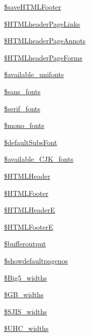 \begin{DoxyCompactItemize}
\item 
\hyperlink{classm_p_d_f_af072919ba19adb69564abc1175ee6567}{\$save\-H\-T\-M\-L\-Footer}
\item 
\hyperlink{classm_p_d_f_a36a156c638bd2c7f15f72a08c208e6e3}{\$\-H\-T\-M\-Lheader\-Page\-Links}
\item 
\hyperlink{classm_p_d_f_a54e852272422f94522d6d027cea57733}{\$\-H\-T\-M\-Lheader\-Page\-Annots}
\item 
\hyperlink{classm_p_d_f_ada74a3da5b8e7e2577dd66cd05fae9fe}{\$\-H\-T\-M\-Lheader\-Page\-Forms}
\item 
\hyperlink{classm_p_d_f_a0d267d11816f00bad05fe54b7eff4a24}{\$available\-\_\-unifonts}
\item 
\hyperlink{classm_p_d_f_ad84d66f570dc7f9bf5a9faf76c5b5762}{\$sans\-\_\-fonts}
\item 
\hyperlink{classm_p_d_f_afe87ae286892d34444ae2a75e9c58ed3}{\$serif\-\_\-fonts}
\item 
\hyperlink{classm_p_d_f_a12ec56afba6bd5ef2902c36371567487}{\$mono\-\_\-fonts}
\item 
\hyperlink{classm_p_d_f_a3859d89513c50bfe6ef9ef035ea4a390}{\$default\-Subs\-Font}
\item 
\hyperlink{classm_p_d_f_a7603165ca11db8cc033e859bfa5e955c}{\$available\-\_\-\-C\-J\-K\-\_\-fonts}
\item 
\hyperlink{classm_p_d_f_a4593a4dfde9d9dafd87530f342f90fa4}{\$\-H\-T\-M\-L\-Header}
\item 
\hyperlink{classm_p_d_f_ad58be6079672039077739a61dd7e5c2f}{\$\-H\-T\-M\-L\-Footer}
\item 
\hyperlink{classm_p_d_f_a151a84595462704dd12a7c1bb4dd80b6}{\$\-H\-T\-M\-L\-Header\-E}
\item 
\hyperlink{classm_p_d_f_a7d32b9cec71347d86fafef4ba4f04af4}{\$\-H\-T\-M\-L\-Footer\-E}
\item 
\hyperlink{classm_p_d_f_aabe5f99c2838902a98789c8d9b9fb8f1}{\$bufferoutput}
\item 
\hyperlink{classm_p_d_f_a068918ae074dae646fc0c41f7aea0769}{\$showdefaultpagenos}
\item 
\hyperlink{classm_p_d_f_a7f463e5f5af32782f00ecd32ff1be745}{\$\-Big5\-\_\-widths}
\item 
\hyperlink{classm_p_d_f_aab02e8172b4eda49a723661dc604a183}{\$\-G\-B\-\_\-widths}
\item 
\hyperlink{classm_p_d_f_a7ef272985aed0a059a8c046f86a4b69f}{\$\-S\-J\-I\-S\-\_\-widths}
\item 
\hyperlink{classm_p_d_f_ad63c2a05507035556f2a42057d801f39}{\$\-U\-H\-C\-\_\-widths}

\end{DoxyCompactItemize}
